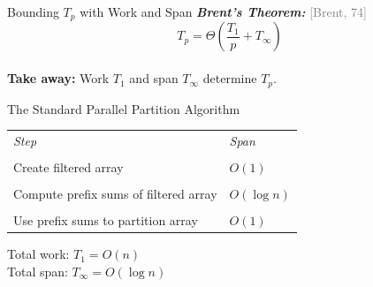 \documentclass[xcolor=x11names, svgnames, rgb]{beamer}
\newcommand{\defn}[1]       {{\textit{\textbf{\boldmath #1}}}}
\newtheorem{defin}{Definition}
\newcommand{\citefont}[1]{{\tiny \textcolor{Gray}{#1}}}
\begin{document}
\begin{frame}[t]{Bounding $T_p$ with Work and Span}
	\defn{Brent's Theorem:} \citefont{[Brent, 74]}
	$$T_p = \Theta\left(\frac{T_1}{p}+T_\infty\right)$$
	$ $\\ \vspace{1cm}
	\textbf{Take away:} Work $T_1$ and span $T_\infty$ determine $T_p$.
\end{frame}


\begin{frame}[t]{The Standard Parallel Partition Algorithm}
\begin{table}[]
\begin{tabular}{ll}
	\emph{Step}                                              & \emph{Span} \\\\
Create filtered array                             & $O(1)$            \\\\
Compute prefix sums of filtered array & $O(\log n)$       \\\\
Use prefix sums to partition array                & $O(1)$           
\end{tabular}
\end{table}
\vspace{10 mm}
Total work: $T_1 = O(n)$\\
Total span: $T_\infty = O(\log n)$

\end{frame}

\end{document}
